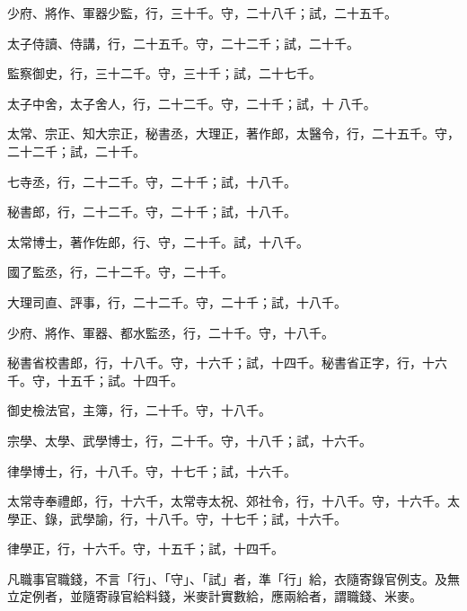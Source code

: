 \begin{pinyinscope}
 少府、將作、軍器少監，行，三十千。守，二十八千；試，二十五千。



 太子侍讀、侍講，行，二十五千。守，二十二千；試，二十千。



 監察御史，行，三十二千。守，三十千；試，二十七千。



 太子中舍，太子舍人，行，二十二千。守，二十千；試，十
 八千。



 太常、宗正、知大宗正，秘書丞，大理正，著作郎，太醫令，行，二十五千。守，二十二千；試，二十千。



 七寺丞，行，二十二千。守，二十千；試，十八千。



 秘書郎，行，二十二千。守，二十千；試，十八千。



 太常博士，著作佐郎，行、守，二十千。試，十八千。



 國了監丞，行，二十二千。守，二十千。



 大理司直、評事，行，二十二千。守，二十千；試，十八千。



 少府、將作、軍器、都水監丞，行，二十千。守，十八千。



 秘書省校書郎，行，十八千。守，十六千；試，十四千。秘書省正字，行，十六千。守，十五千；試。十四千。



 御史檢法官，主簿，行，二十千。守，十八千。



 宗學、太學、武學博士，行，二十千。守，十八千；試，十六千。



 律學博士，行，十八千。守，十七千；試，十六千。



 太常寺奉禮郎，行，十六千，太常寺太祝、郊社令，行，十八千。守，十六千。太學正、錄，武學諭，行，十八千。守，十七千；試，十六千。



 律學正，行，十六千。守，十五千；試，十四千。



 凡職事官職錢，不言「行」、「守」、「試」者，準「行」給，衣隨寄錄官例支。及無立定例者，並隨寄祿官給料錢，米麥計實數給，應兩給者，謂職錢、米麥。




\end{pinyinscope}
